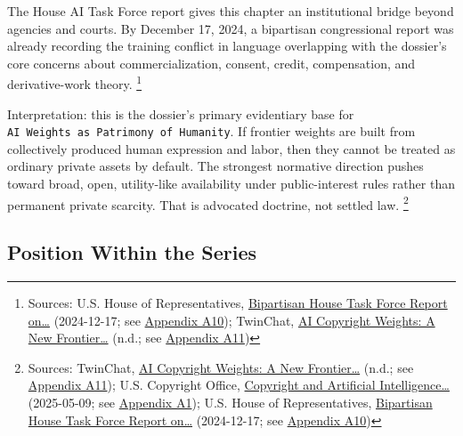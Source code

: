 \documentclass[
  american,
  11pt,
  letterpaper,
]{article}
\begin{document}
The House AI Task Force report gives this chapter an institutional
bridge beyond agencies and courts. By December 17, 2024, a bipartisan
congressional report was already recording the training conflict in
language overlapping with the dossier's core concerns about
commercialization, consent, credit, compensation, and derivative-work
theory. \footnote{Sources: U.S. House of Representatives,
  \href{https://www.speaker.gov/wp-content/uploads/2024/12/AI-Task-Force-Report-FINAL.pdf}{Bipartisan
  House Task Force Report on\ldots{}} (2024-12-17; see
  \hyperref[appendix-a10-bipartisan-house-task-force-report-on-artificial-intelligence]{Appendix
  A10}); TwinChat,
  \href{https://medium.com/twinchat/ai-copyright-weights-a-new-frontier-in-intellectual-property-law-d8ee1b6c55ee}{AI
  Copyright Weights: A New Frontier\ldots{}} (n.d.; see
  \hyperref[appendix-a11-ai-copyright-weights-a-new-frontier-in-intellectual-property-law]{Appendix
  A11})}

Interpretation: this is the dossier's primary evidentiary base for
\texttt{AI\ Weights\ as\ Patrimony\ of\ Humanity}. If frontier weights
are built from collectively produced human expression and labor, then
they cannot be treated as ordinary private assets by default. The
strongest normative direction pushes toward broad, open, utility-like
availability under public-interest rules rather than permanent private
scarcity. That is advocated doctrine, not settled law. \footnote{Sources:
  TwinChat,
  \href{https://medium.com/twinchat/ai-copyright-weights-a-new-frontier-in-intellectual-property-law-d8ee1b6c55ee}{AI
  Copyright Weights: A New Frontier\ldots{}} (n.d.; see
  \hyperref[appendix-a11-ai-copyright-weights-a-new-frontier-in-intellectual-property-law]{Appendix
  A11}); U.S. Copyright Office,
  \href{https://copyright.gov/ai/Copyright-and-Artificial-Intelligence-Part-3-Generative-AI-Training-Report-Pre-Publication-Version.pdf}{Copyright
  and Artificial Intelligence\ldots{}} (2025-05-09; see
  \hyperref[appendix-a1-copyright-and-artificial-intelligence-part-3-generative-ai-training-pre-publication-version]{Appendix
  A1}); U.S. House of Representatives,
  \href{https://www.speaker.gov/wp-content/uploads/2024/12/AI-Task-Force-Report-FINAL.pdf}{Bipartisan
  House Task Force Report on\ldots{}} (2024-12-17; see
  \hyperref[appendix-a10-bipartisan-house-task-force-report-on-artificial-intelligence]{Appendix
  A10})}

\subsection{Position Within the
Series}\label{position-within-the-series}
\end{document}

